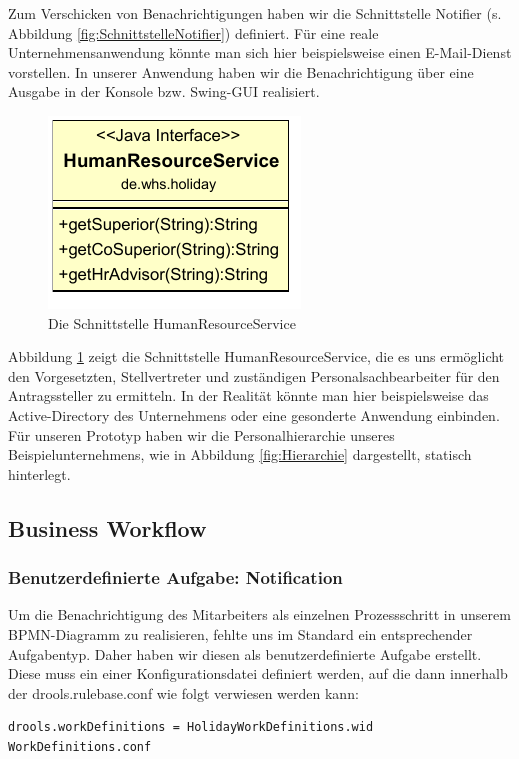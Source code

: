 Zum Verschicken von Benachrichtigungen haben wir die Schnittstelle Notifier (s. Abbildung \ref{fig:SchnittstelleNotifier}) definiert. Für eine reale Unternehmensanwendung könnte man sich hier beispielsweise einen E-Mail-Dienst vorstellen. In unserer Anwendung haben wir die Benachrichtigung über eine Ausgabe in der Konsole bzw. Swing-GUI realisiert.

\begin{figure}[H]
\centering
\includegraphics[width=0.3\linewidth]{Bilder/SchnittstelleHumanResourceService}
\caption{Die Schnittstelle HumanResourceService}
\label{fig:SchnittstelleHumanResourceService}
\end{figure}

Abbildung \ref{fig:SchnittstelleHumanResourceService} zeigt die Schnittstelle HumanResourceService, die es uns ermöglicht den Vorgesetzten, Stellvertreter und zuständigen Personalsachbearbeiter für den Antragssteller zu ermitteln. In der Realität könnte man hier beispielsweise das Active-Directory des Unternehmens oder eine gesonderte Anwendung einbinden. Für unseren Prototyp haben wir die Personalhierarchie unseres Beispielunternehmens, wie in Abbildung \ref{fig:Hierarchie} dargestellt, statisch hinterlegt.

\newpage
\subsection{Business Workflow}

\subsubsection{Benutzerdefinierte Aufgabe: Notification}
Um die Benachrichtigung des Mitarbeiters als einzelnen Prozessschritt in unserem BPMN-Diagramm zu realisieren, fehlte uns im Standard ein entsprechender Aufgabentyp. Daher haben wir diesen als benutzerdefinierte Aufgabe erstellt. Diese muss ein einer Konfigurationsdatei definiert werden, auf die dann innerhalb der drools.rulebase.conf wie folgt verwiesen werden kann:
\begin{lstlisting}
drools.workDefinitions = HolidayWorkDefinitions.wid WorkDefinitions.conf
\end{lstlisting}

